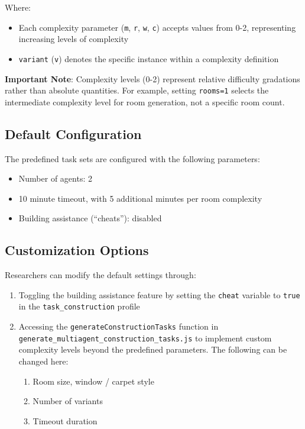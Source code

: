 \documentclass{article}
\begin{document}
Where:
\begin{itemize}
    \item Each complexity parameter (\texttt{m}, \texttt{r}, \texttt{w}, \texttt{c}) accepts values from 0-2, representing increasing levels of complexity
    \item \texttt{variant} (\texttt{v}) denotes the specific instance within a complexity definition
\end{itemize}

\noindent\textbf{Important Note}: Complexity levels (0-2) represent relative difficulty gradations rather than absolute quantities. For example, setting \texttt{rooms=1} selects the intermediate complexity level for room generation, not a specific room count.

\subsection{Default Configuration}
The predefined task sets are configured with the following parameters:
\begin{itemize}
    \item Number of agents: 2
    \item 10 minute timeout, with 5 additional minutes per room complexity
    \item Building assistance (``cheats''): disabled
\end{itemize}

\subsection{Customization Options}
Researchers can modify the default settings through:
\begin{enumerate}
    \item Toggling the building assistance feature by setting the \texttt{cheat} variable to \texttt{true} in the \texttt{task\_construction} profile
    \item Accessing the \texttt{generateConstructionTasks} function in \texttt{generate\_multiagent\_construction\_tasks.js} to implement custom complexity levels beyond the predefined parameters. The following can be changed here:
    \begin{enumerate}
        \item Room size, window / carpet style
        \item Number of variants
        \item Timeout duration
    \end{enumerate}
\end{enumerate}
\end{document}
